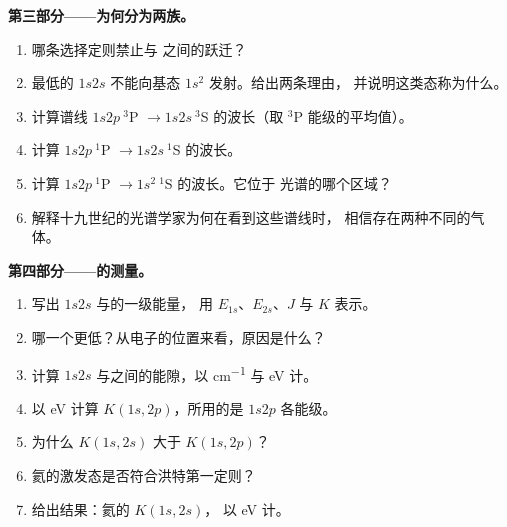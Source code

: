 \begin{problem}
\medskip\noindent\textbf{第三部分——为何分为两族。}
\begin{enumerate}[resume]
  \item 哪条选择定则禁止与
        之间的跃迁？
  \item 最低的 $1s2s$  不能向基态
        $1s^2$  发射。给出两条理由，
        并说明这类态称为什么。
  \item 计算谱线 $1s2p\ {}^3$P $\to 1s2s\ {}^3$S 的波长（取
        ${}^3$P 能级的平均值）。
  \item 计算 $1s2p\ {}^1$P $\to 1s2s\ {}^1$S 的波长。
  \item 计算 $1s2p\ {}^1$P $\to 1s^2\ {}^1$S 的波长。它位于
        光谱的哪个区域？
  \item 解释十九世纪的光谱学家为何在看到这些谱线时，
        相信存在两种不同的气体。
\end{enumerate}

\medskip\noindent\textbf{第四部分——的测量。}
\begin{enumerate}[resume]
  \item 写出 $1s2s$ 与的一级能量，
        用 $E_{1s}$、$E_{2s}$、$J$ 与 $K$ 表示。
  \item 哪一个更低？从电子的位置来看，原因是什么？
  \item 计算 $1s2s$ 与之间的能隙，以 \unit{cm^{-1}} 与 eV 计。
  \item 以 eV 计算 $K(1s,2p)$，所用的是 $1s2p$ 各能级。
  \item 为什么 $K(1s,2s)$ 大于 $K(1s,2p)$？
  \item 氦的激发态是否符合洪特第一定则？
  \item 给出结果：氦的 $K(1s,2s)$，
        以 eV 计。
\end{enumerate}
\end{problem}
